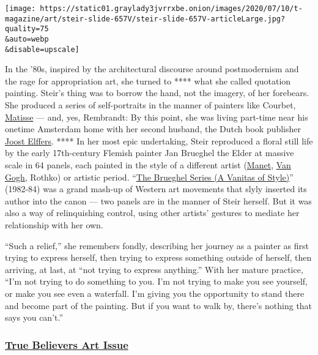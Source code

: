 \texttt{[image: https://static01.graylady3jvrrxbe.onion/images/2020/07/10/t-magazine/art/steir-slide-657V/steir-slide-657V-articleLarge.jpg?quality=75\\\&auto=webp\\\&disable=upscale]}

In the '80s, inspired by the architectural discourse around
postmodernism and the rage for appropriation art, she turned to ****
what she called quotation painting. Steir's thing was to borrow the
hand, not the imagery, of her forebears. She produced a series of
self-portraits in the manner of painters like Courbet,
\href{https://www.nytimes3xbfgragh.onion/topic/person/henri-matisse}{Matisse}
--- and, yes, Rembrandt: By this point, she was living part-time near
his onetime Amsterdam home with her second husband, the Dutch book
publisher
\href{https://www.nytimes3xbfgragh.onion/2019/10/28/style/the-secret-language-of-birthdays.html}{Joost
Elffers}. **** In her most epic undertaking, Steir reproduced a floral
still life by the early 17th-century Flemish painter Jan Brueghel the
Elder at massive scale in 64 panels, each painted in the style of a
different artist
(\href{https://www.nytimes3xbfgragh.onion/topic/person/edouard-manet}{Manet},
\href{https://www.nytimes3xbfgragh.onion/topic/person/vincent-van-gogh}{Van
Gogh}, Rothko) or artistic period.
``\href{https://www.brooklynmuseum.org/opencollection/exhibitions/998}{The
Brueghel Series (A Vanitas of Style)}'' (1982-84) was a grand mash-up of
Western art movements that slyly inserted its author into the canon ---
two panels are in the manner of Steir herself. But it was also a way of
relinquishing control, using other artists' gestures to mediate her
relationship with her own.

``Such a relief,'' she remembers fondly, describing her journey as a
painter as first trying to express herself, then trying to express
something outside of herself, then arriving, at last, at ``not trying to
express anything.'' With her mature practice, ``I'm not trying to do
something to you. I'm not trying to make you see yourself, or make you
see even a waterfall. I'm giving you the opportunity to stand there and
become part of the painting. But if you want to walk by, there's nothing
that says you can't.''

\hypertarget{true-believers-art-issue}{%
\subsubsection{\texorpdfstring{\href{https://www.nytimes3xbfgragh.onion/issue/t-magazine/2020/07/02/true-believers-art-issue}{True
Believers Art
Issue}}{True Believers Art Issue}}\label{true-believers-art-issue}}

